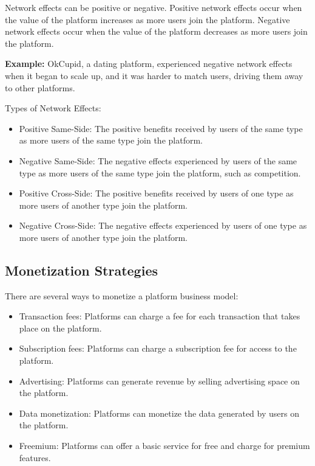 Network effects can be positive or negative. Positive network effects occur when the value of 
the platform increases as more users join the platform. 
Negative network effects occur when the value of the platform decreases as more users join the platform.

\begin{callout}
	\textbf{Example:} OkCupid, a dating platform, experienced negative network effects when it began to scale up, and it was harder to match users, driving them away to other platforms.
\end{callout}

	Types of Network Effects:
\begin{itemize}
	\item Positive Same-Side: The positive benefits received by users of the same type as more users of the same type join the platform.
	\item Negative Same-Side: The negative effects experienced by users of the same type as more users of the same type join the platform, such as competition.
	\item Positive Cross-Side: The positive benefits received by users of one type as more users of another type join the platform.
	\item Negative Cross-Side: The negative effects experienced by users of one type as more users of another type join the platform.
\end{itemize}

\subsection{Monetization Strategies}
There are several ways to monetize a platform business model:

\begin{itemize}
	\item Transaction fees: Platforms can charge a fee for each transaction that takes place on the platform.
	\item Subscription fees: Platforms can charge a subscription fee for access to the platform.
	\item Advertising: Platforms can generate revenue by selling advertising space on the platform.
	\item Data monetization: Platforms can monetize the data generated by users on the platform.
	\item Freemium: Platforms can offer a basic service for free and charge for premium features.
\end{itemize}

